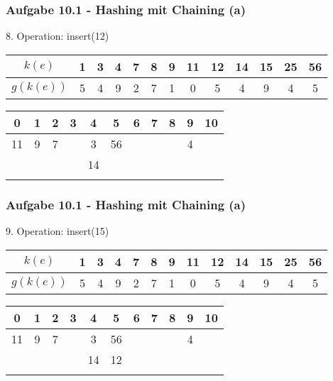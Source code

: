   \begin{frame}
    \frametitle{Aufgabe 10.1 - Hashing mit Chaining (a)}
    8. Operation: insert(12)
    \begin{center}
      \begin{tabular}{c|c|c|c|c|c|c|c|c|c|c|c|c}
        $k(e)$    & 1 & 3 & 4 & 7 & 8 & 9 & 11 & 12 & 14 & 15 & 25 & 56 \\
        \hline
        $g(k(e))$ & 5 & 4 & 9 & 2 & 7 & 1 & 0  & 5  & 4  & 9  & 4  & 5  \\
      \end{tabular}
  
      \bigskip
  
      \begin{tabular}{c|c|c|c|c|c|c|c|c|c|c}
        0  & 1 & 2 & 3 & 4  & 5  & 6 & 7 & 8 & 9 & 10 \\
        \hline
        11 & 9 & 7 &   & 3  & 56 &   &   &   & 4 &    \\
           &   &   &   & 14 &    &   &   &   &   &    \\
           &   &   &   &    &    &   &   &   &   &    \\
      \end{tabular}
    \end{center}
  \end{frame}
  
  \begin{frame}
    \frametitle{Aufgabe 10.1 - Hashing mit Chaining (a)}
    9. Operation: insert(15)
    \begin{center}
      \begin{tabular}{c|c|c|c|c|c|c|c|c|c|c|c|c}
        $k(e)$    & 1 & 3 & 4 & 7 & 8 & 9 & 11 & 12 & 14 & 15 & 25 & 56 \\
        \hline
        $g(k(e))$ & 5 & 4 & 9 & 2 & 7 & 1 & 0  & 5  & 4  & 9  & 4  & 5  \\
      \end{tabular}
  
      \bigskip
  
      \begin{tabular}{c|c|c|c|c|c|c|c|c|c|c}
        0  & 1 & 2 & 3 & 4  & 5  & 6 & 7 & 8 & 9 & 10 \\
        \hline
        11 & 9 & 7 &   & 3  & 56 &   &   &   & 4 &    \\
           &   &   &   & 14 & 12 &   &   &   &   &    \\
           &   &   &   &    &    &   &   &   &   &    \\
      \end{tabular}
    \end{center}
  \end{frame}
  
